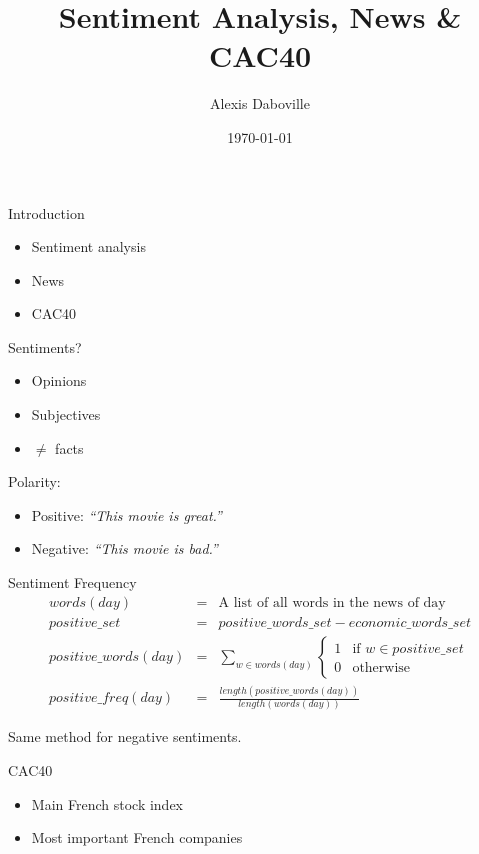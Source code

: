 \documentclass{beamer}
\title{Sentiment Analysis, News \& CAC40}
\author{Alexis Daboville}
\institute{Trinity College Dublin}
\date{\today}
\begin{document}
\begin{frame}
	\titlepage
\end{frame}

\begin{frame}{Introduction}
	\begin{itemize}
		\item Sentiment analysis
		\item News
		\item CAC40
	\end{itemize}
\end{frame}

\begin{frame}{Sentiments?}
	\begin{itemize}
		\item Opinions
		\item Subjectives
		\item $\neq$ facts
	\end{itemize}

	\pause

	Polarity:
	\begin{itemize}
		\item Positive: \emph{``This movie is {\color{green}great}.''}
		\item Negative: \emph{``This movie is {\color{red}bad}.''}
	\end{itemize}
\end{frame}

\begin{frame}{Sentiment Frequency}
	\begin{eqnarray*}
		words(day) &=& \textrm{A list of all words in the news of day}\\
  positive\_set &=& positive\_words\_set - economic\_words\_set\\
	positive\_words(day) &=& \sum_{w \in words(day)} \begin{cases}1 & \mbox{if }w \in positive\_set\\ 0 & \mbox{otherwise }\end{cases}\\
		positive\_freq(day) &=& \frac{length(positive\_words(day))}{length(words(day))}
	\end{eqnarray*}

	\pause

	Same method for negative sentiments.

\end{frame}

\begin{frame}{CAC40}
	\begin{itemize}
		\item Main French stock index
		\item Most important French companies
	\end{itemize}
\end{frame}
\end{document}

